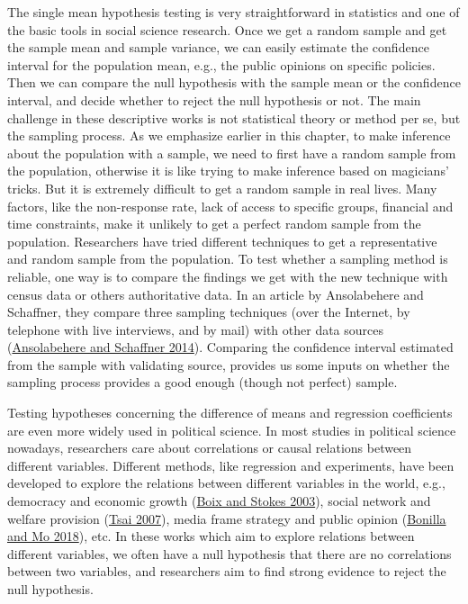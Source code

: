 \documentclass{book}
\begin{document}
The single mean hypothesis testing is very straightforward in statistics and
one of the basic tools in social science research. Once we get a random sample
and get the sample mean and sample variance, we can easily estimate the
confidence interval for the population mean, e.g., the public opinions on
specific policies. Then we can compare the null hypothesis with the sample
mean or the confidence interval, and decide whether to reject the null
hypothesis or not. The main challenge in these descriptive works is not
statistical theory or method per se, but the sampling process. As we emphasize
earlier in this chapter, to make inference about the population with a sample,
we need to first have a random sample from the population, otherwise it is
like trying to make inference based on magicians' tricks. But it is extremely
difficult to get a random sample in real lives. Many factors, like the
non-response rate, lack of access to specific groups, financial and time
constraints, make it unlikely to get a perfect random sample from the
population. Researchers have tried different techniques to get a
representative and random sample from the population. To test whether a
sampling method is reliable, one way is to compare the findings we get with
the new technique with census data or others authoritative data. In an article
by Ansolabehere and Schaffner, they compare three sampling techniques (over
the Internet, by telephone with live interviews, and by mail) with other data
sources (\protect\hyperlink{ref-ansolabehere2014does}{Ansolabehere and
Schaffner 2014}). Comparing the confidence interval estimated from the sample
with validating source, provides us some inputs on whether the sampling
process provides a good enough (though not perfect) sample.

Testing hypotheses concerning the difference of means and regression
coefficients are even more widely used in political science. In most studies
in political science nowadays, researchers care about correlations or causal
relations between different variables. Different methods, like regression and
experiments, have been developed to explore the relations between different
variables in the world, e.g., democracy and economic growth
(\protect\hyperlink{ref-boix2003endogenous}{Boix and Stokes 2003}), social
network and welfare provision (\protect\hyperlink{ref-tsai_2007}{Tsai 2007}),
media frame strategy and public opinion
(\protect\hyperlink{ref-bonilla_mo_2018}{Bonilla and Mo 2018}), etc. In these
works which aim to explore relations between different variables, we often
have a null hypothesis that there are no correlations between two variables,
and researchers aim to find strong evidence to reject the null hypothesis.
\end{document}
